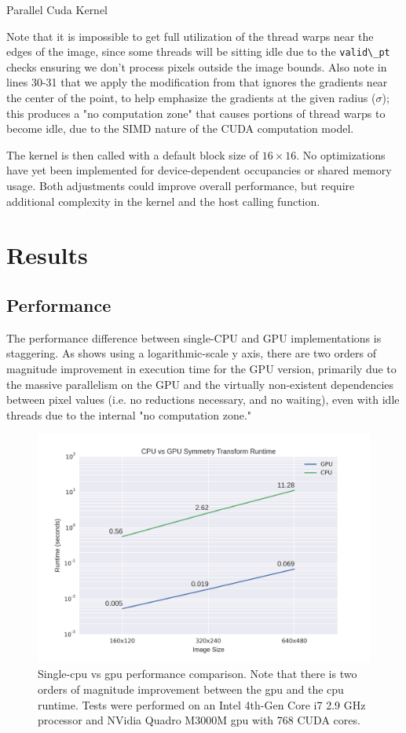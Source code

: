 \begin{algorithm}[ht]
\caption{Parallel Cuda Kernel}\label{alg:kernel}

\end{algorithm}

Note that it is impossible to get full utilization of the thread warps near the edges of the image, since some threads will be sitting idle due to the \texttt{valid\textbackslash{}\_pt} checks ensuring we don't process pixels outside the image bounds. Also note in lines 30-31 that we apply the modification from \cite{kootstra_using_2010} that ignores the gradients near the center of the point, to help emphasize the gradients at the given radius (\(\sigma\)); this produces a "no computation zone" that causes portions of thread warps to become idle, due to the SIMD nature of the CUDA computation model.

The kernel is then called with a default block size of \(16\times16\). No optimizations have yet been implemented for device-dependent occupancies or shared memory usage. Both adjustments could improve overall performance, but require additional complexity in the kernel and the host calling function. 

\section{Results}
\label{sec:results}
\subsection{Performance}
\label{sec:performance}

The performance difference between single-CPU and GPU implementations is staggering. As  shows using a logarithmic-scale y axis, there are two orders of magnitude improvement in execution time for the GPU version, primarily due to the massive parallelism on the GPU and the virtually non-existent dependencies between pixel values (i.e. no reductions necessary, and no waiting), even with idle threads due to the internal "no computation zone." 

\begin{figure}[htbp]
\centering
\includegraphics[width=0.6\linewidth]{figures/cpu_v_gpu.png}
\caption{\label{fig:perf}
Single-\gls{cpu} vs \gls{gpu} performance comparison. Note that there is two orders of magnitude improvement between the \gls{gpu} and the \gls{cpu} runtime. Tests were performed on an Intel 4th-Gen Core i7 2.9 GHz processor and NVidia Quadro M3000M \gls{gpu} with 768 CUDA cores.}
\end{figure}

